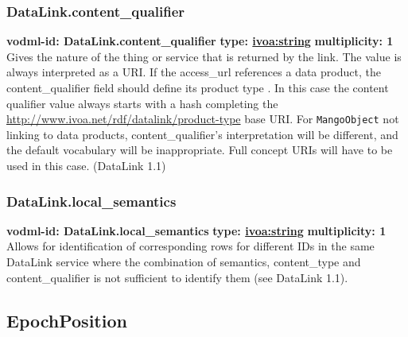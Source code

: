     \subsubsection{DataLink.content\_qualifier}
      \textbf{vodml-id: DataLink.content\_qualifier} \newline
      \textbf{type: \hyperref[sect:ivoa]{ivoa:string}} \newline
      \textbf{multiplicity: 1} \newline
      Gives the nature of the thing or service that is returned by the link. The value is always interpreted as a URI. If the access\_url references a data product, the content\_qualifier field should define its product type . In this case the content qualifier value always starts with a hash completing the \url{http://www.ivoa.net/rdf/datalink/product-type} base URI. For \texttt{MangoObject} not linking to data products, content\_qualifier’s interpretation will be different, and the default vocabulary will be inappropriate. Full concept URIs will have to be used in this case. (DataLink 1.1)

    \subsubsection{DataLink.local\_semantics}
      \textbf{vodml-id: DataLink.local\_semantics} \newline
      \textbf{type: \hyperref[sect:ivoa]{ivoa:string}} \newline
      \textbf{multiplicity: 1} \newline
      Allows for identification of corresponding rows for different IDs in the same DataLink service where the combination of semantics, content\_type and content\_qualifier is not sufficient to identify them (see DataLink 1.1).

  \subsection{EpochPosition}

